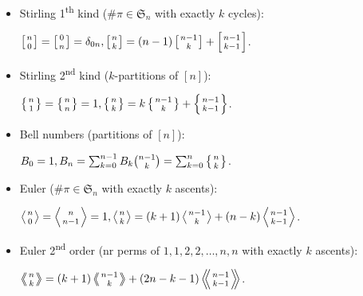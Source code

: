 \documentclass[9pt,a4paper,landscape,oneside]{amsart}
\newenvironment{myitemize}
{\begin{itemize}[leftmargin=.3cm]
	\setlength{\itemsep}{0pt}
	\setlength{\parskip}{0pt}
	\setlength{\parsep}{0pt}     }
{ \end{itemize}                  }
\begin{document}
\begin{multicols*}{3}
\begin{myitemize}
	\item Stirling 1\textsuperscript{th} kind ($\# \pi \in \mathfrak{S}_n$ with exactly $k$ cycles):

		$\left[{n\atop 0}\right]=\left[{0\atop n}\right] = \delta_{0n}, \left[{n\atop k}\right]=(n-1)\left[{n-1\atop k}\right]+\left[{n-1\atop k-1}\right]$.

	\item Stirling 2\textsuperscript{nd} kind ($k$-partitions of $[n]$):

		$\left\{{n\atop 1}\right\}=\left\{{n\atop n}\right\}=1, \left\{{n\atop k}\right\} = k \left\{{ n-1 \atop k }\right\} + \left\{{n-1\atop k-1}\right\}$.

    \item Bell numbers (partitions of $[n]$):

		$B_0 = 1, B_n = \sum_{k=0}^{n-1} B_k \binom{n-1}{k} = \sum_{k=0}^n\left\{{n\atop k}\right\}$.

	\item Euler ($\# \pi \in \mathfrak{S}_n$ with exactly $k$ ascents):

		$\left \langle {n\atop 0} \right \rangle = \left \langle {n\atop n-1} \right \rangle = 1, \left \langle {n\atop k} \right \rangle = (k+1) \left \langle {n-1\atop {k}} \right \rangle + (n-k)\left \langle {{n-1}\atop {k-1}} \right \rangle$.

	\item Euler 2\textsuperscript{nd} order (nr perms of ${1, 1, 2, 2, \dots, n, n}$ with exactly $k$ ascents):

		$\left \langle \!\!\left \langle {n\atop k} \right \rangle \!\! \right \rangle = (k+1) \left \langle \!\! \left \langle {{n-1}\atop {k}} \right \rangle \!\! \right \rangle +(2n-k-1)\left \langle \!\! \left \langle {{n-1}\atop {k-1}} \right \rangle  \!\! \right \rangle$.


\end{myitemize}
\end{multicols*}
\end{document}
